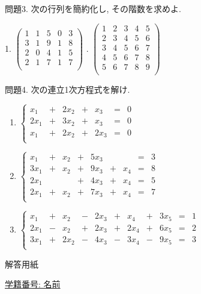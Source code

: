 \documentclass[dvipdfmx,a4paper,11pt]{article}
\theoremstyle{definition}
\begin{document}
 \vspace{5pt}
 問題3.  次の行列を簡約化し, その階数を求めよ.

1.
   \setlength{\parskip}{0cm} %
  \setlength{\itemsep}{0cm} %
$
 \begin{pmatrix}
 1& 1& 5  & 0&3\\
 3& 1& 9  & 1&8\\
 2& 0& 4 & 1&5\\
 2& 1& 7 & 1&7\\
 \end{pmatrix}
 $
   . $
 \begin{pmatrix}
 1& 2& 3  & 4&5\\
 2& 3& 4  & 5&6\\
 3& 4& 5 & 6&7\\
 4& 5& 6 & 7&8\\
 5& 6& 7 & 8&9\\
 \end{pmatrix}
 $
    

 
 問題4. 次の連立1次方程式を解け. 
 
 \begin{enumerate}
    \setlength{\parskip}{0cm} %
  \setlength{\itemsep}{0cm} %
  \item  $
 \left\{ 
\begin{matrix}
x_1& + &  2x_2&  +& x_3&  = & 0 \\
2x_1& + & 3x_2&  +& x_3&  = & 0 \\
 x_1& + & 2x_2&  +& 2x_3&  = & 0 \\
\end{matrix}
\right.
 $
   \item  $
 \left\{ 
\begin{matrix}
x_1& + &  x_2&  +& 5x_3&  && = & 3 \\
3x_1& + &  x_2&  +& 9x_3& + &x_4& = & 8 \\
2x_1&  &  &  +& 4x_3& + &x_4& = & 5 \\
2x_1& + &  x_2&  +& 7x_3& + &x_4& = & 7 \\
\end{matrix}
\right.
 $
    \item  $
 \left\{ 
\begin{array}{ccccccccccc}
x_1& +& x_2&  -&2x_3	&+&x_4& +&3x_5&=& 1\\
2x_1&-&x_2& + &2x_3&+&2x_4&+&6x_5&= &2 \\
3x_1&+&2x_2& - &4x_3& - &  3x_4  &-&9x_5&= &3\\
\end{array}
\right.
 $
\end{enumerate}


 
 \newpage
 \begin{center}
 {\Large 解答用紙}
\end{center}


\begin{flushleft}
{ \large \underline{学籍番号: \hspace{4cm} 名前  \hspace{9cm}   }  }
\end{flushleft}


 
\end{document}
